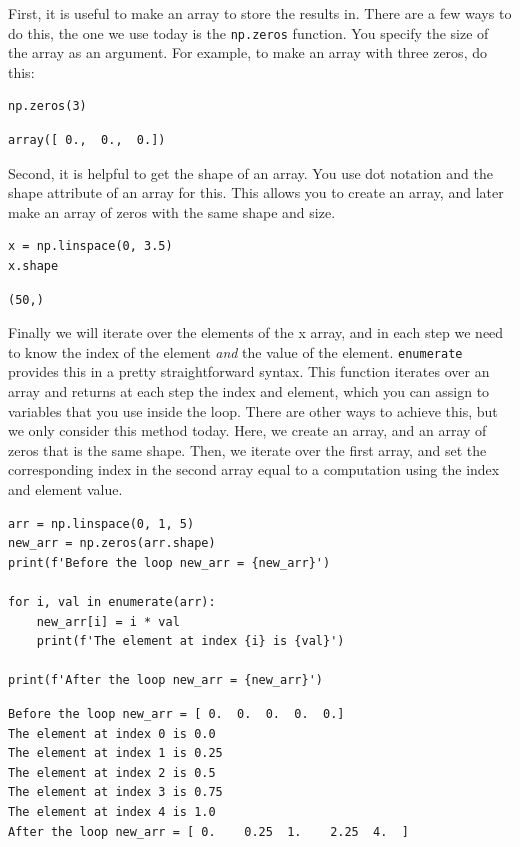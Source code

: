 \documentclass[11pt]{article}
\begin{document}
First, it is useful to make an array to store the results in. There are a few ways to do this, the one we use today is the \texttt{np.zeros} function. You specify the size of the array as an argument. For example, to make an array with three zeros, do this:

\begin{verbatim}
np.zeros(3)
\end{verbatim}

\begin{verbatim}
array([ 0.,  0.,  0.])
\end{verbatim}

Second, it is helpful to get the shape of an array. You use dot notation and the shape attribute of an array for this. This allows you to create an array, and later make an array of zeros with the same shape and size.

\begin{verbatim}
x = np.linspace(0, 3.5)
x.shape
\end{verbatim}

\begin{verbatim}
(50,)
\end{verbatim}

Finally we will iterate over the elements of the x array, and in each step we need to know the index of the element \emph{and} the value of the element. \texttt{enumerate} provides this in a pretty straightforward syntax. This function iterates over an array and returns at each step the index and element, which you can assign to variables that you use inside the loop. There are other ways to achieve this, but we only consider this method today. Here, we create an array, and an array of zeros that is the same shape. Then, we iterate over the first array, and set the corresponding index in the second array equal to a computation using the index and element value.

\begin{verbatim}
arr = np.linspace(0, 1, 5)
new_arr = np.zeros(arr.shape)
print(f'Before the loop new_arr = {new_arr}')

for i, val in enumerate(arr):
    new_arr[i] = i * val
    print(f'The element at index {i} is {val}')

print(f'After the loop new_arr = {new_arr}')
\end{verbatim}

\begin{verbatim}
Before the loop new_arr = [ 0.  0.  0.  0.  0.]
The element at index 0 is 0.0
The element at index 1 is 0.25
The element at index 2 is 0.5
The element at index 3 is 0.75
The element at index 4 is 1.0
After the loop new_arr = [ 0.    0.25  1.    2.25  4.  ]

\end{verbatim}
\end{document}
